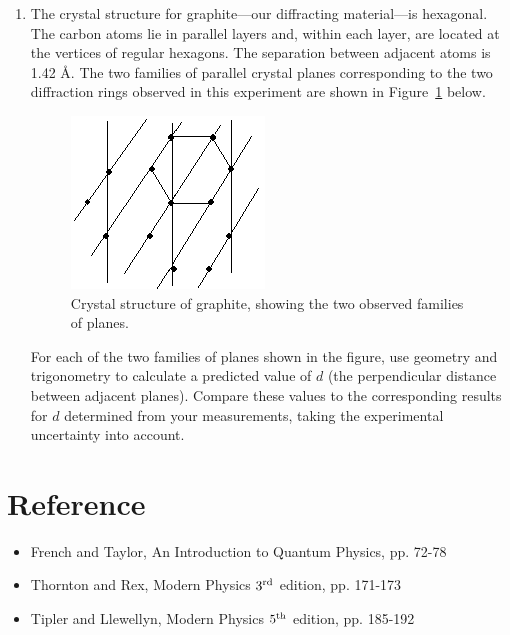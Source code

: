 \begin{enumerate}
\item The crystal structure for graphite---our diffracting
material---is hexagonal. The carbon atoms lie in parallel layers and, within each layer, are located at the vertices of regular hexagons.  The separation between adjacent
atoms is 1.42 \AA.  The two families of parallel crystal planes
corresponding to the two diffraction rings observed in this experiment
are shown in Figure~\ref{fig:graphite} below.
\begin{figure}
\begin{centering}
\includegraphics[width=2.0209in,height=1.802in]{../images/ediffraction-img3.png} 
\caption{Crystal structure of graphite, showing the two observed families of planes.}
\label{fig:graphite}
\end{centering}
\end{figure}

For each of the two families of planes shown in the figure, use geometry
and trigonometry to calculate a predicted value of $d$ (the perpendicular
distance between adjacent planes).  Compare these values to the
corresponding results for $d$ determined from your measurements, taking
the experimental uncertainty into account.

\end{enumerate}

\section{Reference}
\begin{itemize}
\item French and Taylor, An Introduction to Quantum Physics, pp. 72-78
\item Thornton and Rex, Modern Physics $3^{\rm rd}$ edition, pp. 171-173
\item Tipler and Llewellyn, Modern Physics $5^{\rm th}$ edition, pp. 185-192
\end{itemize}
